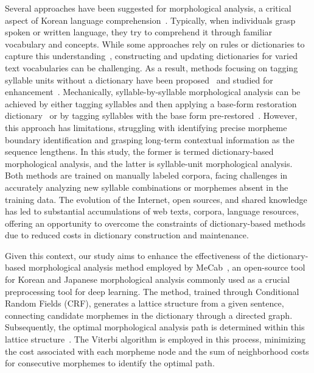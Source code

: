 \documentclass[AMS,STIX2COL]{WileyNJD-v2}
\begin{document}
    Several approaches have been suggested for morphological analysis, a critical aspect of Korean language comprehension~\cite{KwonHC1991, LeeDG2009, ShimKS2011, LeeJS2011, ShinJC2012, LeeCK2013, NaSH2014, NaSH2015, HwangHS2016, KimHM2016, ChungES2016, LeeCH2016, Li2017, NaSH2018, KimSW2018, ChoiYS2018, MinJW2018, MinJW2019, KimHM2019, SongHJ2019, MinJW2020, SongHJ2020, ChoiYS2020, HwangHS2020, KimHJ2021, YounJY2021, MinJW2022, KimJM2022, ShinHJ2023}.
    Typically, when individuals grasp spoken or written language, they try to comprehend it through familiar vocabulary and concepts.
    While some approaches rely on rules or dictionaries to capture this understanding~\cite{KwonHC1991}, constructing and updating dictionaries for varied text vocabularies can be challenging.
    As a result, methods focusing on tagging syllable units without a dictionary have been proposed~\cite{ShimKS2011, LeeCK2013, LeeCH2016, KimHM2016} and studied for enhancement~\cite{KimSW2018, ChoiYS2018, KimHM2019, MinJW2019, SongHJ2019, SongHJ2020, YounJY2021, ShinHJ2023}.
    Mechanically, syllable-by-syllable morphological analysis can be achieved by either tagging syllables and then applying a base-form restoration dictionary~\cite{ShimKS2011, LeeCH2016} or by tagging syllables with the base form pre-restored~\cite{YounJY2021}.
        However, this approach has limitations, struggling with identifying precise morpheme boundary identification and grasping long-term contextual information as the sequence lengthens.
    In this study, the former is termed dictionary-based morphological analysis, and the latter is syllable-unit morphological analysis.
    Both methods are trained on manually labeled corpora, facing challenges in accurately analyzing new syllable combinations or morphemes absent in the training data.
    The evolution of the Internet, open sources, and shared knowledge has led to substantial accumulations of web texts, corpora, language resources, offering an opportunity to overcome the constraints of dictionary-based methods due to reduced costs in dictionary construction and maintenance.

    Given this context, our study aims to enhance the effectiveness of the dictionary-based morphological analysis method employed by MeCab~\cite{MeCab}, an open-source tool for Korean and Japanese morphological analysis commonly used as a crucial preprocessing tool for deep learning.
    The method, trained through Conditional Random Fields (CRF), generates a lattice structure from a given sentence, connecting candidate morphemes in the dictionary through a directed graph.
    Subsequently, the optimal morphological analysis path is determined within this lattice structure~\cite{Kudo2004, NaSH2014, NaSH2018}.
    The Viterbi algorithm is employed in this process, minimizing the cost associated with each morpheme node and the sum of neighborhood costs for consecutive morphemes to identify the optimal path.
\end{document}
